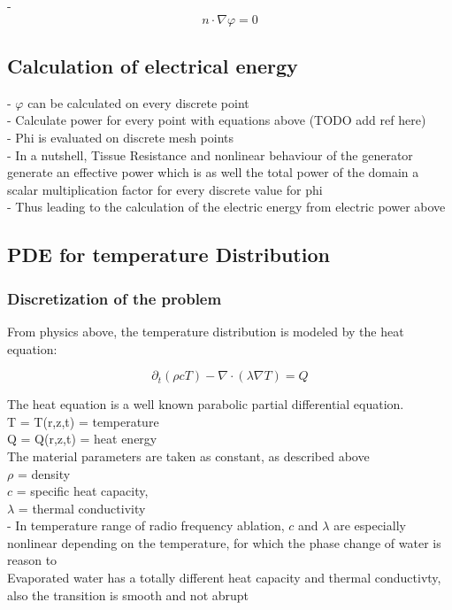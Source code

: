 \documentclass[parskip=half, titlepage=yes, 12pt, BCOR=12mm, DIV=calc]{scrartcl}
\begin{document}
- \begin{equation}
    n \cdot \nabla \varphi = 0
\end{equation}



\subsection{Calculation of electrical energy}

- $\varphi$ can be calculated on every discrete point \\
- Calculate power for every point with equations above (TODO add ref here) \\
- Phi is evaluated on discrete mesh points \\
- In a nutshell, Tissue Resistance and nonlinear behaviour of the generator generate an effective power which is as well the total power of the domain  a scalar multiplication factor for every discrete value for phi \\

- Thus leading to the calculation of the electric energy from electric power above \\


\subsection{PDE for temperature Distribution}

\subsubsection{Discretization of the problem}

From physics above, the temperature distribution is modeled by the heat equation: 

\begin{equation}
    \partial_t (\rho c T) - \nabla \cdot (\lambda \nabla T) = Q
\end{equation}

The heat equation is a well known parabolic partial differential equation. \\

T = T(r,z,t) = temperature \\
Q = Q(r,z,t) = heat energy \\

The material parameters are taken as constant, as described above \\
$\rho$ = density \\
$c$ = specific heat capacity, \\
$\lambda$ = thermal conductivity \\
- In temperature range of radio frequency ablation, $c$ and $\lambda$ are especially nonlinear depending on the temperature, for which the phase change of water is reason to \\ Evaporated water has a totally different heat capacity and thermal conductivty, also the transition is smooth and not abrupt \\
\end{document}

